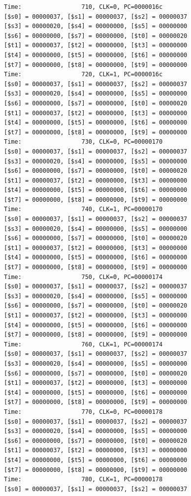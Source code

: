 \documentclass[a4paper,12pt]{article}
\begin{document}
\begin{lstlisting}
Time:                 710, CLK=0, PC=0000016c
[$s0] = 00000037, [$s1] = 00000037, [$s2] = 00000037
[$s3] = 00000020, [$s4] = 00000000, [$s5] = 00000000
[$s6] = 00000000, [$s7] = 00000000, [$t0] = 00000020
[$t1] = 00000037, [$t2] = 00000000, [$t3] = 00000000
[$t4] = 00000000, [$t5] = 00000000, [$t6] = 00000000
[$t7] = 00000000, [$t8] = 00000000, [$t9] = 00000000
Time:                 720, CLK=1, PC=0000016c
[$s0] = 00000037, [$s1] = 00000037, [$s2] = 00000037
[$s3] = 00000020, [$s4] = 00000000, [$s5] = 00000000
[$s6] = 00000000, [$s7] = 00000000, [$t0] = 00000020
[$t1] = 00000037, [$t2] = 00000000, [$t3] = 00000000
[$t4] = 00000000, [$t5] = 00000000, [$t6] = 00000000
[$t7] = 00000000, [$t8] = 00000000, [$t9] = 00000000
Time:                 730, CLK=0, PC=00000170
[$s0] = 00000037, [$s1] = 00000037, [$s2] = 00000037
[$s3] = 00000020, [$s4] = 00000000, [$s5] = 00000000
[$s6] = 00000000, [$s7] = 00000000, [$t0] = 00000020
[$t1] = 00000037, [$t2] = 00000000, [$t3] = 00000000
[$t4] = 00000000, [$t5] = 00000000, [$t6] = 00000000
[$t7] = 00000000, [$t8] = 00000000, [$t9] = 00000000
Time:                 740, CLK=1, PC=00000170
[$s0] = 00000037, [$s1] = 00000037, [$s2] = 00000037
[$s3] = 00000020, [$s4] = 00000000, [$s5] = 00000000
[$s6] = 00000000, [$s7] = 00000000, [$t0] = 00000020
[$t1] = 00000037, [$t2] = 00000000, [$t3] = 00000000
[$t4] = 00000000, [$t5] = 00000000, [$t6] = 00000000
[$t7] = 00000000, [$t8] = 00000000, [$t9] = 00000000
Time:                 750, CLK=0, PC=00000174
[$s0] = 00000037, [$s1] = 00000037, [$s2] = 00000037
[$s3] = 00000020, [$s4] = 00000000, [$s5] = 00000000
[$s6] = 00000000, [$s7] = 00000000, [$t0] = 00000020
[$t1] = 00000037, [$t2] = 00000000, [$t3] = 00000000
[$t4] = 00000000, [$t5] = 00000000, [$t6] = 00000000
[$t7] = 00000000, [$t8] = 00000000, [$t9] = 00000000
Time:                 760, CLK=1, PC=00000174
[$s0] = 00000037, [$s1] = 00000037, [$s2] = 00000037
[$s3] = 00000020, [$s4] = 00000000, [$s5] = 00000000
[$s6] = 00000000, [$s7] = 00000000, [$t0] = 00000020
[$t1] = 00000037, [$t2] = 00000000, [$t3] = 00000000
[$t4] = 00000000, [$t5] = 00000000, [$t6] = 00000000
[$t7] = 00000000, [$t8] = 00000000, [$t9] = 00000000
Time:                 770, CLK=0, PC=00000178
[$s0] = 00000037, [$s1] = 00000037, [$s2] = 00000037
[$s3] = 00000020, [$s4] = 00000000, [$s5] = 00000000
[$s6] = 00000000, [$s7] = 00000000, [$t0] = 00000020
[$t1] = 00000037, [$t2] = 00000000, [$t3] = 00000000
[$t4] = 00000000, [$t5] = 00000000, [$t6] = 00000000
[$t7] = 00000000, [$t8] = 00000000, [$t9] = 00000000
Time:                 780, CLK=1, PC=00000178
[$s0] = 00000037, [$s1] = 00000037, [$s2] = 00000037

\end{lstlisting}
\end{document}
